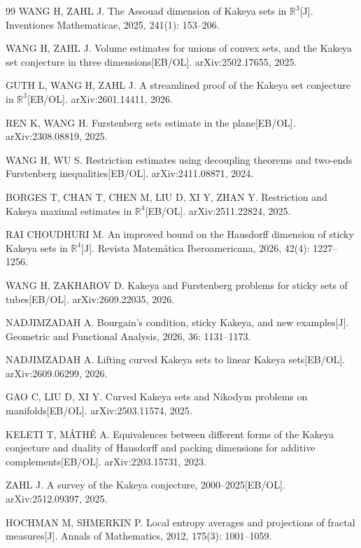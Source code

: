 \begin{thebibliography}{99}
WANG H, ZAHL J. The Assouad dimension of Kakeya sets in $\mathbb{R}^3$[J]. Inventiones Mathematicae, 2025, 241(1): 153--206.

WANG H, ZAHL J. Volume estimates for unions of convex sets, and the Kakeya set conjecture in three dimensions[EB/OL]. arXiv:2502.17655, 2025.

GUTH L, WANG H, ZAHL J. A streamlined proof of the Kakeya set conjecture in $\mathbb{R}^3$[EB/OL]. arXiv:2601.14411, 2026.

REN K, WANG H. Furstenberg sets estimate in the plane[EB/OL]. arXiv:2308.08819, 2025.

WANG H, WU S. Restriction estimates using decoupling theorems and two-ends Furstenberg inequalities[EB/OL]. arXiv:2411.08871, 2024.

BORGES T, CHAN T, CHEN M, LIU D, XI Y, ZHAN Y. Restriction and Kakeya maximal estimates in $\mathbb{R}^4$[EB/OL]. arXiv:2511.22824, 2025.

RAI CHOUDHURI M. An improved bound on the Hausdorff dimension of sticky Kakeya sets in $\mathbb{R}^4$[J]. Revista Matem\'atica Iberoamericana, 2026, 42(4): 1227--1256.

WANG H, ZAKHAROV D. Kakeya and Furstenberg problems for sticky sets of tubes[EB/OL]. arXiv:2609.22035, 2026.

NADJIMZADAH A. Bourgain's condition, sticky Kakeya, and new examples[J]. Geometric and Functional Analysis, 2026, 36: 1131--1173.

NADJIMZADAH A. Lifting curved Kakeya sets to linear Kakeya sets[EB/OL]. arXiv:2609.06299, 2026.

GAO C, LIU D, XI Y. Curved Kakeya sets and Nikodym problems on manifolds[EB/OL]. arXiv:2503.11574, 2025.

KELETI T, M\'ATH\'E A. Equivalences between different forms of the Kakeya conjecture and duality of Hausdorff and packing dimensions for additive complements[EB/OL]. arXiv:2203.15731, 2023.

ZAHL J. A survey of the Kakeya conjecture, 2000--2025[EB/OL]. arXiv:2512.09397, 2025.

HOCHMAN M, SHMERKIN P. Local entropy averages and projections of fractal measures[J]. Annals of Mathematics, 2012, 175(3): 1001--1059.


\end{thebibliography}
